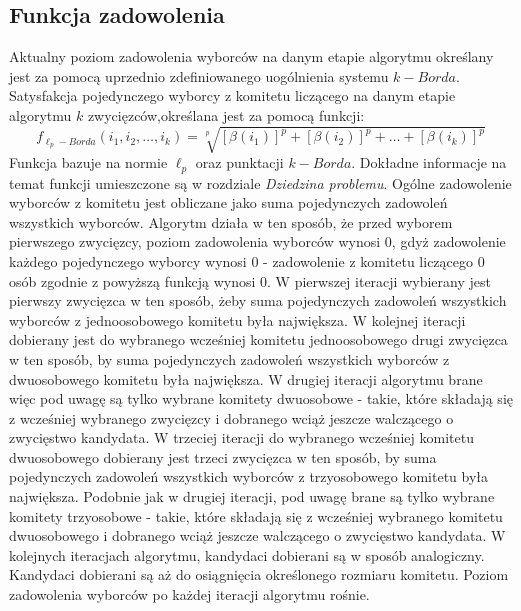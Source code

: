 \documentclass[pdflatex,11pt]{../aghdoc_version2}
\begin{document}
\subsection{Funkcja zadowolenia}
Aktualny poziom zadowolenia wyborców na danym etapie algorytmu określany jest za
pomocą uprzednio zdefiniowanego uogólnienia systemu $k-Borda$. Satysfakcja pojedynczego
wyborcy z komitetu liczącego na danym etapie algorytmu $k$ zwycięzców,określana jest za
pomocą funkcji: 
\begin{equation}
f_{{\ell_p}-Borda}(i_1, i_2,\dots, i_k) = \sqrt[p]{[\beta(i_1)]^p+[\beta(i_2)]^p+\dots+[\beta(i_k)]^p}
\end{equation}
 Funkcja bazuje na normie $\ell_p$ oraz punktacji $k-Borda$. Dokładne informacje na temat funkcji
umieszczone są w rozdziale \textit{Dziedzina problemu}. Ogólne zadowolenie wyborców z komitetu
jest obliczane jako suma pojedynczych zadowoleń wszystkich wyborców. Algorytm działa w
ten sposób, że przed wyborem pierwszego zwycięzcy, poziom zadowolenia wyborców
wynosi $0$, gdyż zadowolenie każdego pojedynczego wyborcy wynosi $0$ - zadowolenie z
komitetu liczącego $0$ osób zgodnie z powyższą funkcją wynosi $0$. W pierwszej iteracji
wybierany jest pierwszy zwycięzca w ten sposób, żeby suma pojedynczych zadowoleń
wszystkich wyborców z jednoosobowego komitetu była największa. W kolejnej iteracji
dobierany jest do wybranego wcześniej komitetu jednoosobowego drugi zwycięzca w ten
sposób, by suma pojedynczych zadowoleń wszystkich wyborców z dwuosobowego komitetu
była największa. W drugiej iteracji algorytmu brane więc pod uwagę są tylko wybrane
komitety dwuosobowe - takie, które składają się z wcześniej wybranego zwycięzcy i
dobranego wciąż jeszcze walczącego o zwycięstwo kandydata. W trzeciej iteracji do
wybranego wcześniej komitetu dwuosobowego dobierany jest trzeci zwycięzca w ten
sposób, by suma pojedynczych zadowoleń wszystkich wyborców z trzyosobowego komitetu
była największa. Podobnie jak w drugiej iteracji, pod uwagę brane są tylko wybrane komitety
trzyosobowe - takie, które składają się z wcześniej wybranego komitetu dwuosobowego i
dobranego wciąż jeszcze walczącego o zwycięstwo kandydata. W kolejnych iteracjach
algorytmu, kandydaci dobierani są w sposób analogiczny. Kandydaci dobierani są aż do
osiągnięcia określonego rozmiaru komitetu. Poziom zadowolenia wyborców po każdej
iteracji algorytmu rośnie.
\end{document}

